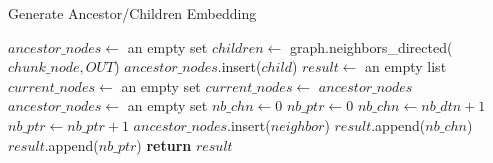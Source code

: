         \begin{algorithm}[H]
            \caption{Generate Ancestor/Children Embedding}
            \label{algo:embedding:generate_ancestor_children_embedding}
            \begin{algorithmic}
                    \State $ancestor\_nodes \gets$ an empty set
                    \State $children \gets$ graph.neighbors\_directed($chunk\_node, OUT$) 
                        \State $ancestor\_nodes$.insert($child$)
                    \EndFor
                    \State $result \gets$ an empty list
                    \State $current\_nodes \gets$ an empty set
                        \State $current\_nodes \gets$ $ancestor\_nodes$ 
                        \State $ancestor\_nodes \gets$ an empty set
                        \State $nb\_chn \gets 0$
                        \State $nb\_ptr \gets 0$
                             
                                \State $nb\_chn \gets nb\_dtn + 1$
                                \State $nb\_ptr \gets nb\_ptr + 1$
                            \EndIf
                                \State $ancestor\_nodes$.insert($neighbor$) 
                            \EndFor
                        \EndFor
                        \State $result$.append($nb\_chn$) 
                        \State $result$.append($nb\_ptr$) 
                    \EndFor
                    \State \textbf{return} $result$
                \EndFunction
            \end{algorithmic}
        \end{algorithm}
        
